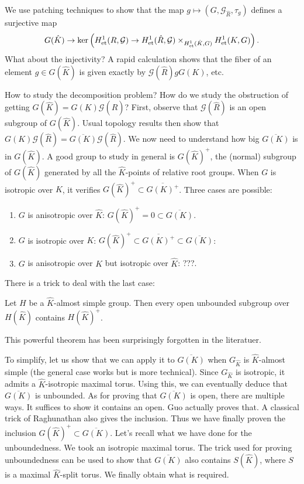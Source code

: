 \documentclass[reqno]{amsart} 
\numberwithin{theorem}{section}
\numberwithin{equation}{section}
\begin{document}
We use patching techniques to show that the map $g \mapsto(G, \mathcal{G}_{\hat{R}}, \tau_g)$ defines a surjective map
\begin{equation*}
  G(\hat{K}) \rightarrow \ker \left( H^1_{\operatorname{et}}(R, \mathcal{G}) \rightarrow H^1_{\operatorname{et}}(\hat{R}, \mathcal{G})
    \times_{H^1_{\operatorname{et}}(\hat{K}, G)} H^1_{\operatorname{et}}(K, G)\right).
\end{equation*}
What about the injectivity?  A rapid calculation shows that the fiber of an element $g \in G(\hat{K})$ is given exactly by $\mathcal{G}(\hat{R}) g G(K)$, etc.

How to study the decomposition problem?  How do we study the obstruction of getting $G(\hat{K}) = G(K) \mathcal{G}(\hat{R})$?  First, observe that $\mathcal{G}(\hat{R})$ is an open subgroup of $G(\hat{K})$.  Usual topology results then show that $G(K) \mathcal{G}(\hat{R}) = \overline{G(K)} \mathcal{G}(\hat{R})$.  We now need to understand how big $\overline{G(K)}$ is in $G(\hat{K})$.  A good group to study in general is $G(\hat{K})^+$, the (normal) subgroup of $G(\hat{K})$ generated by all the $\hat{K}$-points of relative root groups.  When $G$ is isotropic over $K$, it verifies $G(\hat{K})^+ \subset \overline{G(K)^+}$.  Three cases are possible:
\begin{enumerate}
\item $G$ is anisotropic over $\hat{K}$: $G(\hat{K})^+ = 0 \subset \overline{G(K)}$.
\item $G$ is isotropic over $K$: $G(\hat{K})^+ \subset \overline{G(K)^+} \subset \overline{G(K)}$:
\item $G$ is anisotropic over $K$ but isotropic over $\hat{K}$: ???.
\end{enumerate}
There is a trick to deal with the last case:

\begin{theorem}[Prasad, 1982]
  Let $H$ be a $\hat{K}$-almost simple group.  Then every open unbounded subgroup over $H(\hat{K})$ contains $H(\hat{K})^+$.
\end{theorem}
This powerful theorem has been surprisingly forgotten in the literatuer.

To simplify, let us show that we can apply it to $\overline{G(K)}$ when $G_{\hat{K}}$ is $\hat{K}$-almost simple (the general case works but is more technical).  Since $G_{\hat{K}}$ is isotropic, it admits a $\hat{K}$-isotropic maximal torus.  Using this, we can eventually deduce that $\overline{G(K)}$ is unbounded.  As for proving that $\overline{G(K)}$ is open, there are multiple ways.  It suffices to show it contains an open.  Guo actually proves that.  A classical trick of Raghunathan also gives the inclusion.  Thus we have finally proven the inclusion $G(\hat{K})^+ \subset \overline{G(K)}$.  Let's recall what we have done for the unboundedness.  We took an isotropic maximal torus.  The trick used for proving unboundedness can be used to show that $\overline{G(K)}$ also contains $S(\hat{K})$, where $S$ is a maximal $\hat{K}$-split torus.  We finally obtain what is required.
\end{document}
